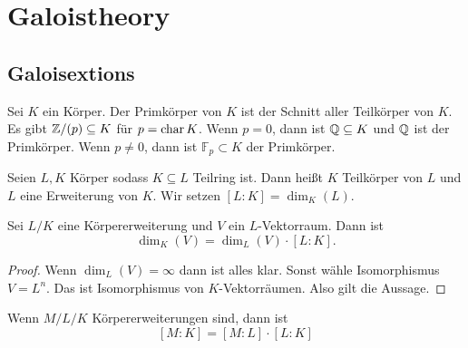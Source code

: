 \section{Galoistheory}
\subsection{Galoisextions}
\begin{Def}
    Sei $K$ ein Körper. Der Primkörper von $K$ ist der Schnitt aller Teilkörper von $K$.
    Es gibt $\mathbb{Z}/(p)\subseteq K$ für $p=\operatorname{char} K$.
Wenn $p=0$, dann ist $\mathbb{Q}\subseteq K$ und $\mathbb{Q}$ ist der Primkörper. Wenn $p\neq 0$, dann ist $\mathbb F_p\subset K$ der Primkörper.
\end{Def}
\begin{Def}
    Seien $L,K$ Körper sodass $K\subseteq L$ Teilring ist. Dann heißt $K$ Teilkörper von $L$ und $L$ eine Erweiterung von $K$. Wir setzen $[L:K]=\dim_K(L)$.
\end{Def}
\begin{Satz}
    Sei $L/K$ eine Körpererweiterung und $V$ ein $L$-Vektorraum. Dann ist $$\dim_K(V)=\dim_L(V)\cdot [L:K].$$
\end{Satz}
\begin{proof}
    Wenn $\dim_L(V)=\infty$ dann ist alles klar. Sonst wähle Isomorphismus $V=L^n$. Das ist Isomorphismus von $K$-Vektorräumen. Also gilt die Aussage.
\end{proof}
\begin{Kor}
    Wenn $M/L/K$ Körpererweiterungen sind, dann ist 
    $$[M:K]=[M:L]\cdot[L:K]$$
\end{Kor}
